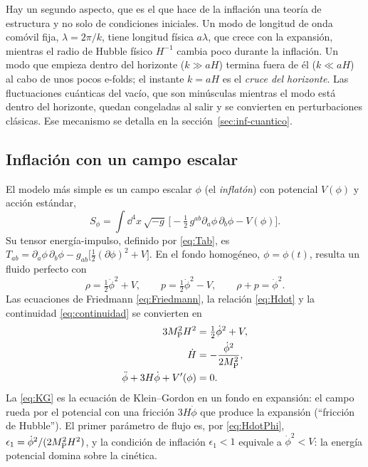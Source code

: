 Hay un segundo aspecto, que es el que hace de la inflación una teoría de estructura y no solo de condiciones iniciales. Un modo de longitud de onda comóvil fija, $\lambda=2\pi/k$, tiene longitud física $a\lambda$, que crece con la expansión, mientras el radio de Hubble físico $H^{-1}$ cambia poco durante la inflación. Un modo que empieza dentro del horizonte ($k\gg aH$) termina fuera de él ($k\ll aH$) al cabo de unos pocos e-folds; el instante $k=aH$ es el \emph{cruce del horizonte}. Las fluctuaciones cuánticas del vacío, que son minúsculas mientras el modo está dentro del horizonte, quedan congeladas al salir y se convierten en perturbaciones clásicas. Ese mecanismo se detalla en la sección~\ref{sec:inf-cuantico}.

\subsection{Inflación con un campo escalar}
\label{sec:inf-campo}

El modelo más simple es un campo escalar $\phi$ (el \emph{inflatón}) con potencial $V(\phi)$ y acción estándar,
\begin{equation}
S_\phi=\int\dd^4x\,\sqrt{-g}\,\Big[-\tfrac12\,g^{ab}\partial_a\phi\,\partial_b\phi-V(\phi)\Big].
\label{eq:Sphi}
\end{equation}
Su tensor energía-impulso, definido por \eqref{eq:Tab}, es $T_{ab}=\partial_a\phi\,\partial_b\phi-g_{ab}\big[\tfrac12(\partial\phi)^2+V\big]$. En el fondo homogéneo, $\phi=\phi(t)$, resulta un fluido perfecto con
\begin{equation}
\rho=\tfrac12\dot\phi^2+V,\qquad p=\tfrac12\dot\phi^2-V,\qquad \rho+p=\dot\phi^2.
\label{eq:rhopphi}
\end{equation}
Las ecuaciones de Friedmann \eqref{eq:Friedmann}, la relación \eqref{eq:Hdot} y la continuidad \eqref{eq:continuidad} se convierten en
\begin{align}
3M_{\rm P}^2H^2&=\tfrac12\dot\phi^2+V, \label{eq:FriedPhi}\\
\dot H&=-\frac{\dot\phi^2}{2M_{\rm P}^2}, \label{eq:HdotPhi}\\
\ddot\phi+3H\dot\phi+V'(\phi)&=0. \label{eq:KG}
\end{align}
La \eqref{eq:KG} es la ecuación de Klein--Gordon en un fondo en expansión: el campo rueda por el potencial con una fricción $3H\dot\phi$ que produce la expansión (``fricción de Hubble''). El primer parámetro de flujo es, por \eqref{eq:HdotPhi}, $\epsilon_1=\dot\phi^2/(2M_{\rm P}^2H^2)$, y la condición de inflación $\epsilon_1<1$ equivale a $\dot\phi^2<V$: la energía potencial domina sobre la cinética.

